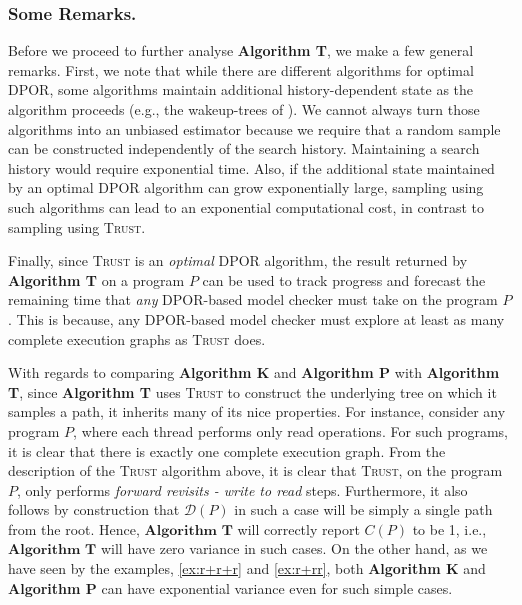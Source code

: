 \documentclass[acmsmall]{acmart}
\newcommand{\trust}{\textsc{Trust}\xspace}
\newcommand{\dpor}{\textsc{DPOR}\xspace}
\begin{document}


\subsubsection*{Some Remarks.} Before we proceed to further analyse \textbf{Algorithm T}, we make a few general remarks. First, we note that while there are different algorithms for optimal \dpor,  some algorithms maintain additional history-dependent state as the algorithm proceeds 
(e.g., the wakeup-trees of \cite{optimal-dpor}).
We cannot always turn those algorithms into an unbiased estimator because we require that a random sample can be constructed independently of the search history.
Maintaining a search history would require exponential time.
Also, if the additional state maintained by an optimal \dpor algorithm can grow exponentially large, sampling using such algorithms can lead to an exponential computational cost, in contrast to sampling using \trust. 

Finally, since \trust is an \emph{optimal} \dpor algorithm, the result returned by \textbf{Algorithm T} on a program $P$ can be used to track progress and forecast the remaining time that \emph{any} DPOR-based model checker must take on the program $P$. This is because, any DPOR-based model checker must explore at least as many complete execution graphs as \trust does. 

With regards to comparing \textbf{Algorithm K} and \textbf{Algorithm P} with \textbf{Algorithm T}, since \textbf{Algorithm T} uses \trust to construct the underlying tree on which it samples a path, it inherits many of its nice properties. For instance, consider any program $P$, where each thread performs only read operations. 
For such programs, it is clear that there is exactly one complete execution graph. 
From the description of the \trust algorithm above, it is clear that \trust, on the program $P$, only performs \emph{forward revisits - write to read} steps. Furthermore, it also follows by construction that $\mathcal{D}(P)$ in such a case will be simply a single path from the root. Hence, $\textbf{Algorithm T}$ will correctly report $C(P)$ to be 1, i.e., $\textbf{Algorithm T}$ will have zero variance in such cases.
On the other hand, as we have seen by the examples, \ref{ex:r+r+r} and \ref{ex:r+rr}, both \textbf{Algorithm K} and \textbf{Algorithm P} can have exponential variance even for such simple cases.
\end{document}
